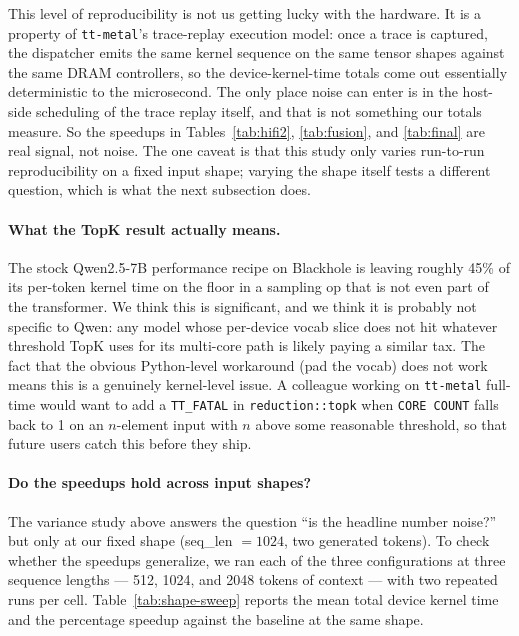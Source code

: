 \documentclass[sigplan,nonacm]{acmart}
\begin{document}
This level of reproducibility is not us getting lucky with the
hardware. It is a property of \texttt{tt-metal}'s trace-replay
execution model: once a trace is captured, the dispatcher emits the
same kernel sequence on the same tensor shapes against the same DRAM
controllers, so the device-kernel-time totals come out essentially
deterministic to the microsecond. The only place noise can enter is
in the host-side scheduling of the trace replay itself, and that is
not something our totals measure. So the speedups in
Tables~\ref{tab:hifi2}, \ref{tab:fusion}, and \ref{tab:final} are
real signal, not noise. The one caveat is that this study only
varies run-to-run reproducibility on a fixed input shape;
varying the shape itself tests a different question, which is what
the next subsection does.

\paragraph{What the TopK result actually means.} The stock
Qwen2.5-7B performance recipe on Blackhole is leaving roughly 45\%
of its per-token kernel time on the floor in a sampling op that is
not even part of the transformer. We think this is significant, and
we think it is probably not specific to Qwen: any model whose
per-device vocab slice does not hit whatever threshold TopK uses for
its multi-core path is likely paying a similar tax. The fact that
the obvious Python-level workaround (pad the vocab) does not work
means this is a genuinely kernel-level issue. A colleague working on
\texttt{tt-metal} full-time would want to add a \texttt{TT\_FATAL}
in \texttt{reduction::topk} when \texttt{CORE COUNT} falls back to 1
on an $n$-element input with $n$ above some reasonable threshold,
so that future users catch this before they ship.

\paragraph{Do the speedups hold across input shapes?}
\label{sec:shape-sweep}
The variance study above answers the question ``is the headline number
noise?'' but only at our fixed shape (seq\_len $=1024$, two generated
tokens). To check whether the speedups generalize, we ran each of the
three configurations at three sequence lengths --- 512, 1024, and
2048 tokens of context --- with two repeated runs per cell.
Table~\ref{tab:shape-sweep} reports the mean total device kernel
time and the percentage speedup against the baseline at the same
shape.
\end{document}
